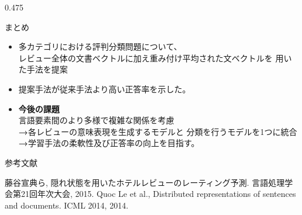 \documentclass[unicode,10pt]{beamer}
\newcommand{\arrow}{\textcolor{ttiblue}{\textbf{→}}\hspace{1ex}}
\newcommand{\itemtitle}[1]{\textbf{#1}\\}
\newcommand{\columnsize}{0.475\textwidth}
\begin{document}
\begin{frame}
\begin{columns}[onlytextwidth,t]
\begin{column}{\columnsize}
  \begin{block}{まとめ}
    \begin{itemize}
      \item 多カテゴリにおける評判分類問題について、\\
            レビュー全体の文書ベクトルに加え重み付け平均された文ベクトルを
            用いた手法を提案
      \item 提案手法が従来手法\cite{fujitani15}より高い正答率を示した。
      \item \itemtitle{今後の課題}
            言語要素間のより多様で複雑な関係を考慮 \\
            \arrow 各レビューの意味表現を生成するモデルと
                   分類を行うモデルを1つに統合 \\
            \arrow 学習手法の柔軟性及び正答率の向上を目指す。
    \end{itemize}
  \end{block}

  参考文献
  
  \begin{thebibliography}{9}
    藤谷宣典ら,
    隠れ状態を用いたホテルレビューのレーティング予測.
    言語処理学会第21回年次大会, 2015.
    Quoc Le et al.,
    Distributed representations of sentences and documents.
    ICML 2014, 2014.
  \end{thebibliography}
\end{column}

\end{columns}
\end{frame}
\end{document}
